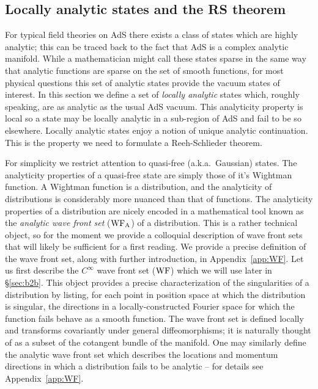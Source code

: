 \documentclass[12pt]{article}
\numberwithin{equation}{section}
\def\WF{{\rm WF}}
\def\WFA{{\rm WF}_{\rm A}}
\begin{document}
\subsection{Locally analytic states and the RS theorem}
\label{sec:RS}


For typical field theories on AdS there exists a class of
states which are highly analytic; this can be traced back to the
fact that AdS is a complex analytic manifold.
While a mathematician might call these states sparse in the same
way that analytic functions are sparse on the set of smooth functions,
for most physical questions this set of analytic states provide
the vacuum states of interest. In this section we define a set 
of \emph{locally analytic} states which, roughly speaking, are 
as analytic as the usual AdS vacuum.
This analyticity property is local so a
state may be locally analytic in a sub-region of AdS and fail
to be so elsewhere.
Locally analytic states enjoy a notion of unique analytic 
continuation. This is the property we need to formulate a
Reeh-Schlieder theorem.


For simplicity we restrict attention to quasi-free (a.k.a.~Gaussian)
states. The analyticity properties of a quasi-free state are simply
those of it's Wightman function. A Wightman function is a distribution,
and the analyticity of distributions is considerably more nuanced than 
that of functions. 
The analyticity properties of a distribution are nicely encoded
in a mathematical tool known as the \emph{analytic wave front 
set} ($\WFA$) of a distribution. This is a rather technical
object, so for the moment we provide a colloquial description of 
wave front sets that will likely be sufficient for a first reading. 
We provide a precise definition of the wave front set, along with 
further introduction, in Appendix~\ref{app:WF}.
Let us first describe the $C^\infty$ wave front set ($\WF$)
which we will use later in \S\ref{sec:b2b}.
This object provides a precise characterization of the singularities
of a distribution by listing, for each point in position space at which the
distribution is singular, the directions in a locally-constructed
Fourier space for which the function fails behave as a smooth function.
The wave front set is defined locally and transforms covariantly
under general diffeomorphisms; it is naturally thought of 
as a subset of the cotangent bundle of the manifold.
One may similarly define the analytic wave front set 
which describes the locations and momentum directions in which
a distribution fails to be analytic -- for details see
Appendix~\ref{app:WF}.
\end{document}
